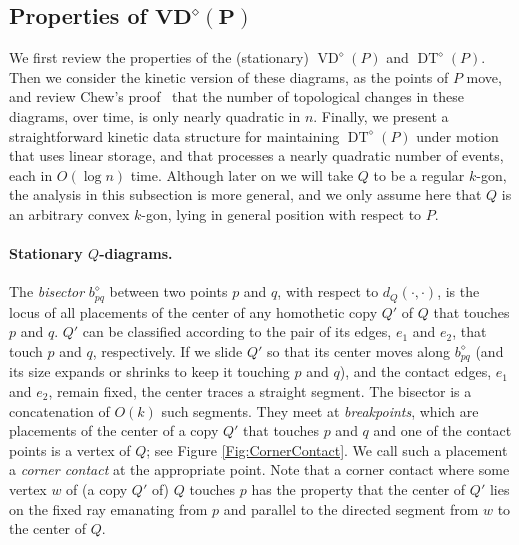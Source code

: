 \documentclass[letter,11pt]{article}
\def\poly{\diamond}
\def\DT{\mathop{\mathrm{DT}}}
\def\VD{\mathop{\mathrm{VD}}}
\begin{document}
\subsection{Properties of $\mathbf{VD^\poly(P)}$}
\label{Sec:PolygonalBackground}
We first review the properties of the (stationary)
$\VD^\poly(P)$ and $\DT^\poly(P)$. Then we consider the
kinetic version of these diagrams, as the points of $P$ move, and
review Chew's proof~\cite{Chew} that the number of topological
changes in these diagrams, over time, is only nearly quadratic
in $n$. Finally, we present a straightforward kinetic data structure 
for maintaining $\DT^\poly(P)$ under motion that uses linear storage, 
and that processes a nearly quadratic number of events, 
each in $O(\log n)$ time. 
Although later on we will take $Q$ to be a regular $k$-gon, the analysis in this subsection is more general, and we only assume here that $Q$ is an arbitrary convex $k$-gon, lying in general position with respect to $P$.


\paragraph{Stationary $Q$-diagrams.}
The {\em bisector} $b_{pq}^\poly$ between
two points $p$ and $q$, with respect to $d_Q(\cdot,\cdot)$, is the 
locus of all
placements of the center of any homothetic copy $Q'$ of $Q$ that
touches $p$ and $q$.
$Q'$ can be classified according to the pair of its edges, $e_1$ and $e_2$,
that touch $p$ and $q$, respectively. If we slide $Q'$ so that its
center moves along $b_{pq}^\poly$ (and its size expands or shrinks to
keep it touching $p$ and $q$), and the contact edges, $e_1$ and $e_2$,
remain fixed, the center traces a straight segment.
The bisector is a concatenation of $O(k)$ such segments. They
meet at {\em breakpoints}, which are placements of the center of a
copy $Q'$ that touches $p$ and $q$ and one of the contact points
is a vertex of $Q$; see Figure \ref{Fig:CornerContact}. We call such a 
placement a {\em corner contact} at the appropriate point. 
Note that a corner contact where some vertex $w$ of (a copy $Q'$ of) $Q$ touches $p$
has the property that the center of $Q'$ lies on the fixed ray
emanating from $p$ and parallel to the directed segment from $w$
to the center of $Q$.
\end{document}
